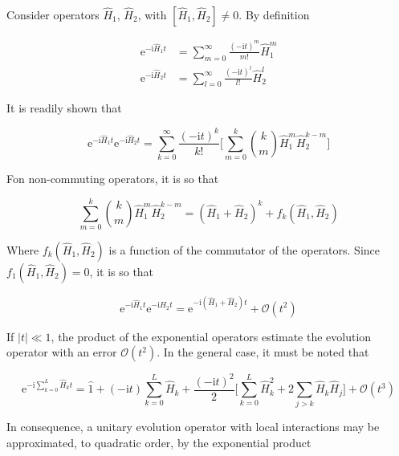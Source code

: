   Consider operators $\hat{H}_1$, $\hat{H}_2$, with $[\hat{H}_1,\hat{H}_2] \neq 0$. By definition

  \begin{align}
    \mathrm{e}^{-\mathrm{i}\hat{H}_1 t} & = \sum_{m = 0}^{\infty} \frac{(-\mathrm{i}t)^m}{m!}\hat{H}_1^m \\
    \mathrm{e}^{-\mathrm{i}\hat{H}_2 t} & = \sum_{l = 0}^{\infty} \frac{(-\mathrm{i}t)^l}{l!}\hat{H}_2^l
    \label{eq:ExpSeries}
  \end{align}

  It is readily shown that

  \begin{equation}
    \mathrm{e}^{-\mathrm{i}\hat{H}_1 t}\mathrm{e}^{-\mathrm{i}\hat{H}_2 t} = \sum_{k = 0}^{\infty} \frac{(-\mathrm{i}t)^k}{k!} \Bigg[\sum_{m = 0}^k \binom{k}{m} \hat{H}_1^m \hat{H}_2^{k-m}\Bigg]
    \label{eq:ExpProdExact}
  \end{equation}

  Fon non-commuting operators, it is so that

  \begin{equation}
    \sum_{m = 0}^k \binom{k}{m} \hat{H}_1^m \hat{H}_2^{k-m} = (\hat{H}_1 + \hat{H}_2)^k + f_k(\hat{H}_1,\hat{H}_2)
    \label{eq:BinomialTheorem}
  \end{equation}

  Where $f_k(\hat{H}_1,\hat{H}_2)$ is a function of the commutator of the operators. Since $f_1(\hat{H}_1,\hat{H}_2) = 0$, it is so that

  \begin{equation}
    \mathrm{e}^{-\mathrm{i}\hat{H}_1 t}\mathrm{e}^{-\mathrm{i}\hat{H}_2 t} = \mathrm{e}^{-\mathrm{i}(\hat{H}_1 + \hat{H}_2) t} + \mathcal{O}(t^2)
    \label{eq:O2Approx}
  \end{equation}

  If $|t| \ll 1$, the product of the exponential operators estimate the evolution operator with an error $\mathcal{O}(t^2)$. In the general case, it must be noted that

  \begin{equation}
    \mathrm{e}^{-\mathrm{i}\sum_{k = 0}^L \hat{H}_k t} = \hat{1} + (-\mathrm{i}t)\sum_{k = 0}^L \hat{H}_k + \frac{(-\mathrm{i}t)^2}{2} \Bigg[\sum_{k = 0}^L \hat{H}_k^2 + 2 \sum_{j > k}\hat{H}_k \hat{H}_j\Bigg] + \mathcal{O}(t^3)
    \label{eq:TrotterFormula}
  \end{equation}

  In consequence, a unitary evolution operator with local interactions may be approximated, to quadratic order, by the exponential product

